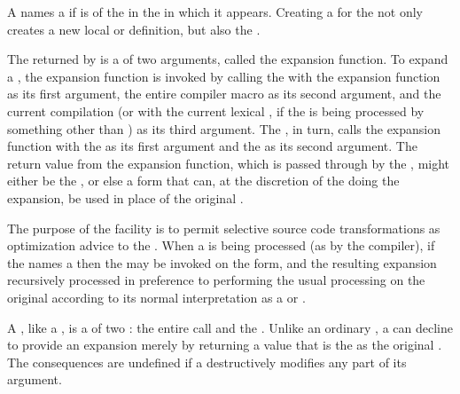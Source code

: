 A  names a  if 
is  of the  in the  in which
it appears.  Creating a  for the 
not only creates a new local  or
 definition, but also  the .

The  returned by 
is a  of two arguments, called the
expansion function.  To expand a ,
the expansion function is invoked by calling the  with
      the expansion function as its first argument,
      the entire compiler macro  as its second argument,
  and the current compilation  
       (or with the current lexical ,
 	 if the  is being processed by something
	 other than ) 
       as its third argument.
The , in turn, calls the expansion function with the
 as its first argument and the  as its second argument.
The return value from the expansion function, which is passed through
by the , might either be the  , 
or else a form that can, at the discretion of the  doing the expansion, 
be used in place of the original .



The purpose of the  facility is to permit 
selective source code transformations as optimization advice 
to the .  When a  is being
processed (as by the compiler), if the  names a
 then the  may be
invoked on the form, and the resulting expansion recursively processed
in preference to performing the usual processing on the original 
according to its normal interpretation as a  or
.
 
A , like a ,
is a  of two : the entire call 
and the . Unlike an ordinary , a 
 can decline to provide an expansion merely by
returning a value that is the  as the original .
The consequences are undefined if a 
destructively modifies any part of its  argument.
 
